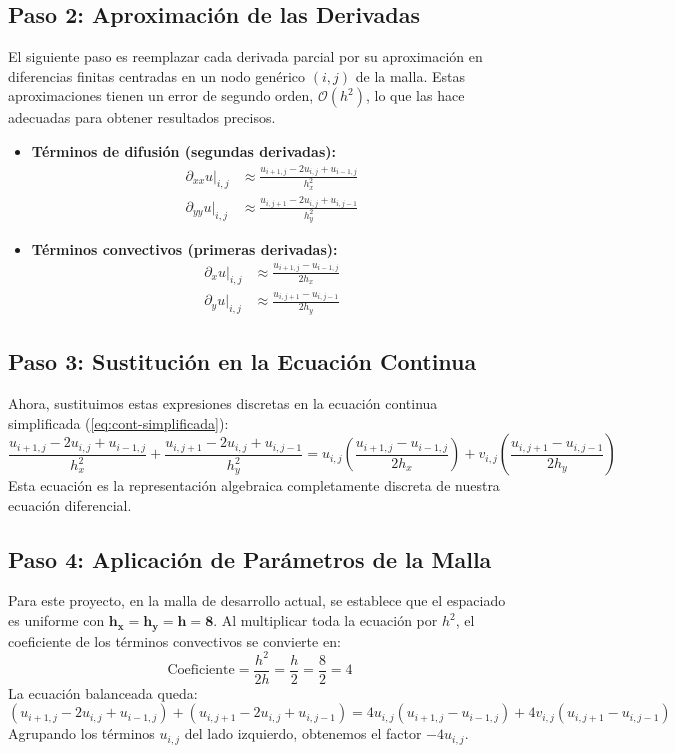 \documentclass[11pt,letterpaper]{article}
\newcommand{\ux}{u}             %
\newcommand{\vyc}{v}            %
\begin{document}
\subsection{Paso 2: Aproximación de las Derivadas}
El siguiente paso es reemplazar cada derivada parcial por su aproximación en diferencias finitas centradas en un nodo genérico $(i,j)$ de la malla. Estas aproximaciones tienen un error de segundo orden, $\mathcal{O}(h^2)$, lo que las hace adecuadas para obtener resultados precisos.

\begin{itemize}
    \item \textbf{Términos de difusión (segundas derivadas):}
    \begin{align*}
    \partial_{xx}\ux\big|_{i,j} &\approx \frac{\ux_{i+1,j}-2\ux_{i,j}+\ux_{i-1,j}}{h_x^2} \\
    \partial_{yy}\ux\big|_{i,j} &\approx \frac{\ux_{i,j+1}-2\ux_{i,j}+\ux_{i,j-1}}{h_y^2}
    \end{align*}
    
    \item \textbf{Términos convectivos (primeras derivadas):}
    \begin{align*}
    \partial_x \ux\big|_{i,j} &\approx \frac{\ux_{i+1,j}-\ux_{i-1,j}}{2h_x} \\
    \partial_y \ux\big|_{i,j} &\approx \frac{\ux_{i,j+1}-\ux_{i,j-1}}{2h_y}
    \end{align*}
\end{itemize}
\subsection{Paso 3: Sustitución en la Ecuación Continua}
Ahora, sustituimos estas expresiones discretas en la ecuación continua simplificada (\cref{eq:cont-simplificada}):
\[
\frac{\ux_{i+1,j}-2\ux_{i,j}+\ux_{i-1,j}}{h_x^2} + \frac{\ux_{i,j+1}-2\ux_{i,j}+\ux_{i,j-1}}{h_y^2} = \ux_{i,j}\left(\frac{\ux_{i+1,j}-\ux_{i-1,j}}{2h_x}\right) + \vyc_{i,j}\left(\frac{\ux_{i,j+1}-\ux_{i,j-1}}{2h_y}\right)
\]
Esta ecuación es la representación algebraica completamente discreta de nuestra ecuación diferencial.

\subsection{Paso 4: Aplicación de Parámetros de la Malla}
Para este proyecto, en la malla de desarrollo actual, se establece que el espaciado es uniforme con $\boldsymbol{h_x = h_y = h = 8}$. Al multiplicar toda la ecuación por $h^2$, el coeficiente de los términos convectivos se convierte en:
\[
\text{Coeficiente} = \frac{h^2}{2h} = \frac{h}{2} = \frac{8}{2} = 4
\]
La ecuación balanceada queda:
\begin{equation}
(\ux_{i+1,j}-2\ux_{i,j}+\ux_{i-1,j}) + (\ux_{i,j+1}-2\ux_{i,j}+\ux_{i,j-1}) = 4\ux_{i,j}(\ux_{i+1,j}-\ux_{i-1,j}) + 4\vyc_{i,j}(\ux_{i,j+1}-\ux_{i,j-1})
\label{eq:disc-general}
\end{equation}
Agrupando los términos $\ux_{i,j}$ del lado izquierdo, obtenemos el factor $-4\ux_{i,j}$.
\end{document}
